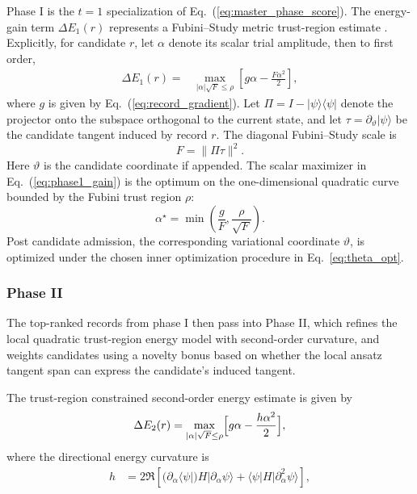 \documentclass[
  reprint,
  amsmath,
  amssymb,
  aps,
  pra,
  nofootinbib,
  superscriptaddress,
  floatfix
]{revtex4-2}
\newcommand{\ket}[1]{|#1\rangle}
\newcommand{\bra}[1]{\langle #1|}
\begin{document}
Phase I is the $t=1$ specialization of Eq.~(\ref{eq:master_phase_score}). The energy-gain term $\Delta E_{1}(r)$ represents a Fubini--Study metric trust-region estimate \cite{Nocedal2006TrustRegion}. Explicitly, for candidate $r$, let $\alpha$ denote its scalar trial amplitude, then to first order,
\begin{equation}
\begin{split}
\Delta E_{1}(r)={}&\max_{|\alpha|\sqrt{F}\le \rho} \left[g\alpha-\frac{F\alpha^2}{2}\right],
\end{split}
\label{eq:phase1_gain}
\end{equation}
where $g$ is given by Eq.~(\ref{eq:record_gradient}). Let $\Pi=I-\ket{\psi}\bra{\psi}$ denote the projector onto the subspace orthogonal to the current state, and let $\tau=\partial_{\vartheta}\ket{\psi}$ be the candidate tangent induced by record $r$. The diagonal Fubini--Study scale is
\begin{equation}
F=\|\Pi\tau\|^2.
\label{eq:phase1_tangent_scale}
\end{equation}
Here $\vartheta$ is the candidate coordinate if appended.
The scalar maximizer in Eq.~(\ref{eq:phase1_gain}) is the optimum on the one-dimensional quadratic curve bounded by the Fubini trust region $\rho$:
\begin{equation}
\alpha^\star
=
\min\!\left(
\dfrac{g}{F},
\dfrac{\rho}{\sqrt{F}}
\right).
\label{eq:phase1_alpha_star}
\end{equation}
 Post candidate admission, the corresponding variational coordinate $\vartheta$, is optimized under the chosen inner optimization procedure in Eq.~\ref{eq:theta_opt}.

\subsubsection{Phase II}

The top-ranked records from phase I then pass into Phase II, which refines the local quadratic trust-region energy model with second-order curvature, and weights candidates using a novelty bonus based on whether the local ansatz tangent span can express the candidate's induced tangent. 

The trust-region constrained second-order energy estimate is given by
\begin{equation}
\Delta E_{2}(r)
=\max_{|\alpha|\sqrt{F}\le\rho}
\Bigl[g\alpha -\frac{h\alpha^2}{2}\Bigr],
\label{eq:phase2_gain}
\end{equation}
where the directional energy curvature is
\begin{align}
h&=
2\Re\!\left[
(\partial_{\alpha}\langle \psi|)H|\partial_{\alpha}\psi\rangle
+\langle\psi|H|\partial^2_{\alpha}\psi\rangle
\right],
\label{eq:phase2_hessian}
\end{align}
  
\end{document}
